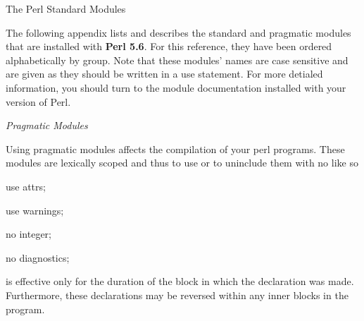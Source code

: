 \documentclass[a4paper,11pt]{book}
\begin{document}

\noindent 

\noindent 

\noindent 

\noindent 

\noindent 

\noindent 

\noindent 

\noindent 

\noindent 

\noindent 

\noindent 

\noindent 

\noindent 

\noindent 

\noindent 

\noindent The Perl Standard Modules

\noindent 

\noindent 

\noindent 

\noindent 

\noindent The following appendix lists and describes the standard and pragmatic modules that are installed with \textbf{Perl 5.6}. For this reference, they have been ordered alphabetically by group. Note that these modules' names are case sensitive and are given as they should be written in a use statement. For more detialed information, you should turn to the module documentation installed with your version of Perl.

\noindent 

\noindent \textit{Pragmatic Modules}

\noindent Using pragmatic modules affects the compilation of your perl programs. These modules are lexically scoped and thus to use or to uninclude them with no like so

\noindent 

\noindent use attrs;

\noindent use warnings;

\noindent no integer;

\noindent no diagnostics;

\noindent 

\noindent is effective only for the duration of the block in which the declaration was made. Furthermore, these declarations may be reversed within any inner blocks in the program.

\noindent 
\end{document}

